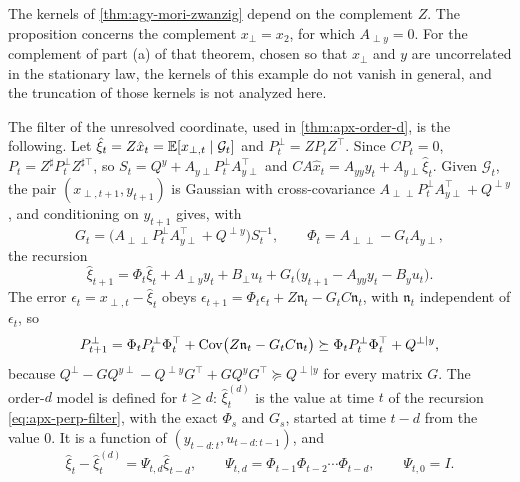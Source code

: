 \begin{remark}\label{rem:apx-kernel-scope}
The kernels of \cref{thm:agy-mori-zwanzig} depend on the complement $Z$. The proposition concerns the complement $x_\perp=x_2$, for which $A_{\perp y}=0$. For the complement of part (a) of that theorem, chosen so that $x_\perp$ and $y$ are uncorrelated in the stationary law, the kernels of this example do not vanish in general, and the truncation of those kernels is not analyzed here.
\end{remark}

The filter of the unresolved coordinate, used in \cref{thm:apx-order-d}, is the following. Let $\hat\xi_t=Z\hat x_t=\mathbb{E}[x_{\perp,t}\mid\mathcal G_t]$ and $P^\perp_t=ZP_tZ^\top$. Since $CP_t=0$, $P_t=Z^\sharp P^\perp_tZ^{\sharp\top}$, so $S_t=Q^y+A_{y\perp}P^\perp_tA_{y\perp}^\top$ and $CA\hat x_t=A_{yy}y_t+A_{y\perp}\hat\xi_t$. Given $\mathcal G_t$, the pair $(x_{\perp,t+1},y_{t+1})$ is Gaussian with cross-covariance $A_{\perp\perp}P^\perp_tA_{y\perp}^\top+Q^{\perp y}$, and conditioning on $y_{t+1}$ gives, with
\begin{equation*}
G_t=\bigl(A_{\perp\perp}P^\perp_tA_{y\perp}^\top+Q^{\perp y}\bigr)S_t^{-1},\qquad\Phi_t=A_{\perp\perp}-G_tA_{y\perp},
\end{equation*}
the recursion
\begin{equation}\label{eq:apx-perp-filter}
\hat\xi_{t+1}=\Phi_t\hat\xi_t+A_{\perp y}y_t+B_\perp u_t+G_t\bigl(y_{t+1}-A_{yy}y_t-B_yu_t\bigr).
\end{equation}
The error $\epsilon_t=x_{\perp,t}-\hat\xi_t$ obeys $\epsilon_{t+1}=\Phi_t\epsilon_t+Z\mathfrak n_t-G_tC\mathfrak n_t$, with $\mathfrak n_t$ independent of $\epsilon_t$, so
\begin{equation}\label{eq:apx-joseph}
P^\perp_{t+1}=\Phi_tP^\perp_t\Phi_t^\top+\operatorname{Cov}\bigl(Z\mathfrak n_t-G_tC\mathfrak n_t\bigr)\succeq\Phi_tP^\perp_t\Phi_t^\top+Q^{\perp\mid y},
\end{equation}
because $Q^\perp-GQ^{y\perp}-Q^{\perp y}G^\top+GQ^yG^\top\succeq Q^{\perp\mid y}$ for every matrix $G$. The order-$d$ model is defined for $t\ge d$: $\hat\xi^{(d)}_t$ is the value at time $t$ of the recursion \cref{eq:apx-perp-filter}, with the exact $\Phi_s$ and $G_s$, started at time $t-d$ from the value $0$. It is a function of $(y_{t-d:t},u_{t-d:t-1})$, and
\begin{equation*}
\hat\xi_t-\hat\xi^{(d)}_t=\Psi_{t,d}\hat\xi_{t-d},\qquad\Psi_{t,d}=\Phi_{t-1}\Phi_{t-2}\cdots\Phi_{t-d},\qquad\Psi_{t,0}=I .
\end{equation*}

